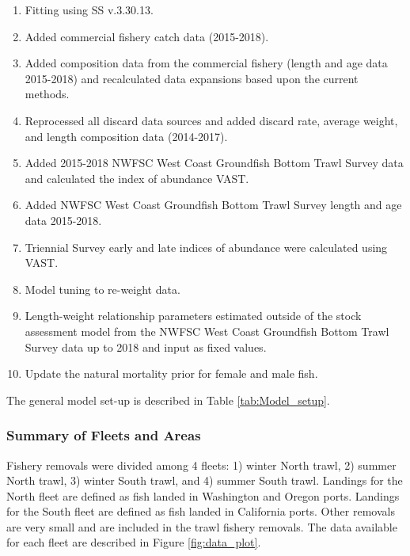 \documentclass[12pt,]{article}
\begin{document}
\begin{enumerate}

\item Fitting using SS v.3.30.13.

\item Added commercial fishery catch data (2015-2018).

\item Added composition data from the commercial fishery (length and age data 2015-2018) and recalculated data expansions based upon the current methods.

\item Reprocessed all discard data sources and added discard rate, average weight, and length composition data (2014-2017).

\item Added 2015-2018 NWFSC West Coast Groundfish Bottom Trawl Survey  data and calculated the index of abundance VAST.

\item Added NWFSC West Coast Groundfish Bottom Trawl Survey length and age data 2015-2018.

\item Triennial Survey early and late indices of abundance were calculated using VAST.

\item Model tuning to re-weight data. 

\item Length-weight relationship parameters estimated outside of the stock assessment model from the NWFSC West Coast Groundfish Bottom Trawl Survey data up to 2018 and input as fixed values.

\item Update the natural mortality prior for female and male fish.

\end{enumerate}

The general model set-up is described in Table \ref{tab:Model_setup}.

\subsubsection{Summary of Fleets and
Areas}\label{summary-of-fleets-and-areas}

Fishery removals were divided among 4 fleets: 1) winter North trawl, 2)
summer North trawl, 3) winter South trawl, and 4) summer South trawl.
Landings for the North fleet are defined as fish landed in Washington
and Oregon ports. Landings for the South fleet are defined as fish
landed in California ports. Other removals are very small and are
included in the trawl fishery removals. The data available for each
fleet are described in Figure \ref{fig:data_plot}.
\end{document}

